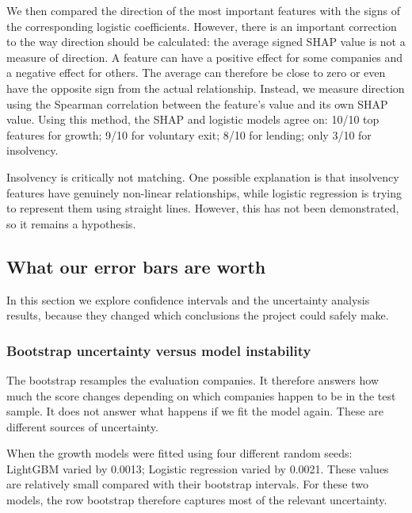 \documentclass[    author={Samuel Menon Demelo; Sneha Saphala Ram Prasad; 
Viktor Ander Lindholm; Vishal Khatri},
               supervisor={Prof. Fernando Moreno-Pino},
                   degree={MSc},
                    title={Lloyds Commercial Banking Intelligence},
                 subtitle={Ranking SME Lending, Risk and Growth Prospects for Lloyds Banking Group},
                     type={},
                     year={2026}]{dissertation}
\begin{document}
We then compared the direction of the most important features with the signs of the corresponding logistic coefficients. However, there is an important correction to the way direction should be calculated: the average signed SHAP value is not a measure of direction. A feature can have a positive effect for some companies and a negative effect for others. The average can therefore be close to zero or even have the opposite sign from the actual relationship. Instead, we measure direction using the Spearman correlation between the feature's value and its own SHAP value. Using this method, the SHAP and logistic models agree on: 10/10 top features for growth; 9/10 for voluntary exit; 8/10 for lending; only 3/10 for insolvency.

Insolvency is critically not matching. One possible explanation is that insolvency features have genuinely non-linear relationships, while logistic regression is trying to represent them using straight lines. However, this has not been demonstrated, so it remains a hypothesis.

\subsection{What our error bars are worth}
\label{sec:errors}
In this section we explore confidence intervals and the uncertainty analysis results, because they changed which conclusions the project could safely make.

\subsubsection{Bootstrap uncertainty versus model instability}
The bootstrap resamples the evaluation companies. It therefore answers how much the score changes depending on which companies happen to be in the test sample. It does not answer what happens if we fit the model again. These are different sources of uncertainty.

When the growth models were fitted using four different random seeds: LightGBM varied by 0.0013; Logistic regression varied by 0.0021. These values are relatively small compared with their bootstrap intervals. For these two models, the row bootstrap therefore captures most of the relevant uncertainty.
\end{document}
